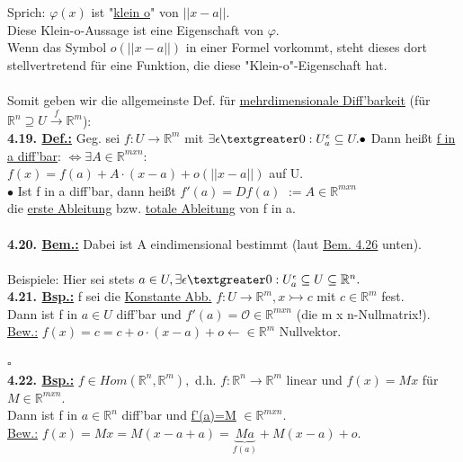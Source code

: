 \documentclass[]{scrartcl}
\begin{document}
Sprich: $\varphi(x)$ ist "\underline{klein o}" von $||x-a||$.\\
Diese Klein-o-Aussage ist eine Eigenschaft von $\varphi$.\\
Wenn das Symbol $o(||x-a||)$ in einer Formel vorkommt, steht dieses dort 
stellvertretend für eine Funktion, die diese "Klein-o"-Eigenschaft hat.\\
\\
Somit geben wir die allgemeinste Def. für \underline{mehrdimensionale 
Diff'barkeit} (für $\mathbb{R}^n\supseteq U \xrightarrow{f}\mathbb{R}^m$):\\
\textbf{4.19. \underline{Def.:}} Geg. sei $f:U\rightarrow\mathbb{R}^m$ mit 
$\exists \epsilon\textgreater0: U_a^\epsilon\subseteq U.\\
\bullet$ Dann heißt \ul{f in a diff'bar}: $\Leftrightarrow 
\exists A \in \mathbb{R}^{m x n}$:\\
$f(x)=f(a)+A\cdot(x-a)+o(||x-a||)$ auf U.\\
$\bullet$ Ist f in a diff'bar, dann heißt \ul{$f'(a)=Df(a)$} 
$:=A\in\mathbb{R}^{m x n}$\\
die \ul{erste Ableitung} bzw. \ul{totale Ableitung} von f in 
a.\\
\\
\textbf{4.20. \underline{Bem.:}} Dabei ist A eindimensional bestimmt (laut 
\ul{Bem. 4.26} unten).\\
\\
Beispiele: Hier sei stets $a\in U, \exists\epsilon 
\textgreater0:U_a^\epsilon\subseteq U\subseteq\mathbb{R}^n.$\\
\textbf{4.21. \underline{Bsp.:}} f sei die \ul{Konstante 
Abb.} $f:U\rightarrow\mathbb{R}^m, x\rightarrowtail c$ mit $c\in\mathbb{R}^m$ 
fest.\\
Dann ist f in $a\in U$ diff'bar und \ul{$f'(a)=\mathcal{O}$}$\in\mathbb{R}^{m x 
n}$ (die m x n-Nullmatrix!).\\
\underline{Bew.:} $f(x)=c=c+o\cdot(x-a)+o \leftarrow \in\mathbb{R}^m$ 
Nullvektor.\\
\strut\hfill$\square$\\
\textbf{4.22. \underline{Bsp.:}} $f\in Hom(\mathbb{R}^n,\mathbb{R}^m),$ d.h. 
$f:\mathbb{R}^n
\rightarrow\mathbb{R}^m$ linear und \ul{$f(x)=Mx$} für $M\in\mathbb{R}^{m x 
n}$.\\
Dann ist f in $a\in\mathbb{R}^n$ diff'bar und \ul{f'(a)=M} $\in\mathbb{R}^{m x 
n}$.\\
\underline{Bew.:} $f(x) = Mx =M(x-a+a)=\underbrace{Ma}_{f(a)}+M(x-a)+o.$\\
\end{document}
